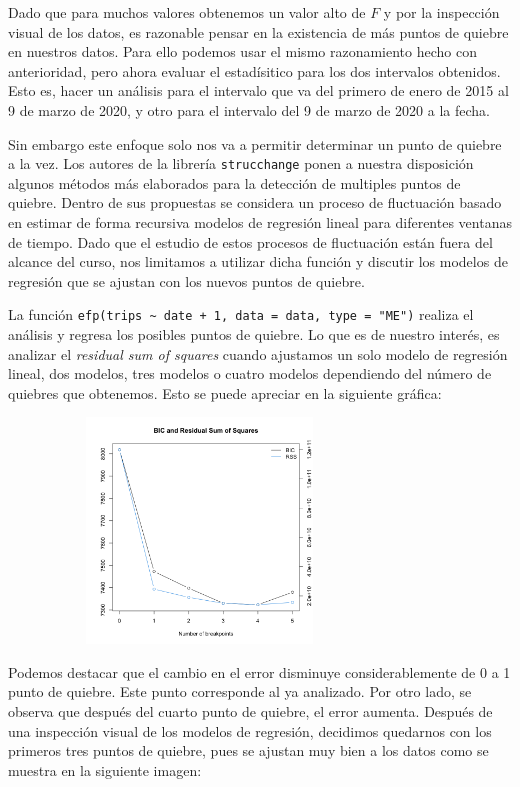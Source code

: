 \documentclass[
]{article}
\begin{document}
Dado que para muchos valores obtenemos un valor alto de \(F\) y por la
inspección visual de los datos, es razonable pensar en la existencia de
más puntos de quiebre en nuestros datos. Para ello podemos usar el mismo
razonamiento hecho con anterioridad, pero ahora evaluar el estadísitico
para los dos intervalos obtenidos. Esto es, hacer un análisis para el
intervalo que va del primero de enero de 2015 al 9 de marzo de 2020, y
otro para el intervalo del 9 de marzo de 2020 a la fecha.

Sin embargo este enfoque solo nos va a permitir determinar un punto de
quiebre a la vez. Los autores de la librería \texttt{strucchange} ponen
a nuestra disposición algunos métodos más elaborados para la detección
de multiples puntos de quiebre. Dentro de sus propuestas se considera un
proceso de fluctuación basado en estimar de forma recursiva modelos de
regresión lineal para diferentes ventanas de tiempo. Dado que el estudio
de estos procesos de fluctuación están fuera del alcance del curso, nos
limitamos a utilizar dicha función y discutir los modelos de regresión
que se ajustan con los nuevos puntos de quiebre.

La función
\texttt{efp(trips\ \textasciitilde{}\ date\ +\ 1,\ data\ =\ data,\ type\ =\ "ME")}
realiza el análisis y regresa los posibles puntos de quiebre. Lo que es
de nuestro interés, es analizar el \emph{residual sum of squares} cuando
ajustamos un solo modelo de regresión lineal, dos modelos, tres modelos
o cuatro modelos dependiendo del número de quiebres que obtenemos. Esto
se puede apreciar en la siguiente gráfica:

\begin{figure}[h]
\centering
\includegraphics[width=8cm, height=6cm]{../plots/structChange_files/structChange_17_3.png}
\end{figure}

Podemos destacar que el cambio en el error disminuye considerablemente
de 0 a 1 punto de quiebre. Este punto corresponde al ya analizado. Por
otro lado, se observa que después del cuarto punto de quiebre, el error
aumenta. Después de una inspección visual de los modelos de regresión,
decidimos quedarnos con los primeros tres puntos de quiebre, pues se
ajustan muy bien a los datos como se muestra en la siguiente imagen:
\end{document}
